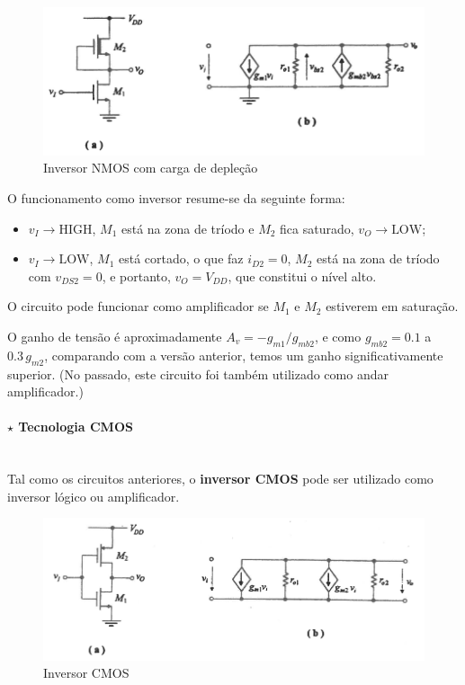 \begin{figure}[H]
    \centering
    \includegraphics[width=0.6\linewidth]{img/5/inv-NMOS-carga-dep.png}
    \caption{Inversor NMOS com carga de depleção \cite{medeiros:CTBM}}
    \label{fig:inv-NMOS-carga-dep}
\end{figure}

\vspace{-0.75em}
\noindent O funcionamento como inversor resume-se da seguinte forma:
\begin{itemize}[leftmargin=*, nolistsep, label=]
    \item $v_I \to \text{HIGH}$, $M_1$ está na zona de tríodo e $M_2$ fica saturado, $v_O \to \text{LOW}$;
    \item $v_I \to \text{LOW}$, $M_1$ está cortado, o que faz $i_{D2} = 0$, $M_2$ está na zona de tríodo com $v_{DS2} = 0$, e portanto, $v_O = V_{DD}$, que constitui o nível alto.
\end{itemize}

\begin{mdframed}
    \noindent O circuito pode funcionar como amplificador se $M_1$ e $M_2$ estiverem em saturação.

    O ganho de tensão é aproximadamente $A_v = -g_{m1}/g_{mb2}$, e como $g_{mb2} = 0.1$ a $0.3\, g_{m2}$, comparando com a versão anterior, temos um ganho significativamente superior. (No passado, este circuito foi também utilizado como andar amplificador.)
\end{mdframed}

\paragraph[5.1.1.3 Tecnologia CMOS]{$\pmb{\star}$ Tecnologia CMOS}\mbox{}\\[4pt]
Tal como os circuitos anteriores, o \textbf{inversor CMOS} pode ser utilizado como inversor lógico ou amplificador.

\begin{figure}[H]
    \centering
    \includegraphics[width=0.6\linewidth]{img/5/inv-CMOS.png}
    \caption{Inversor CMOS \cite{medeiros:CTBM}}
    \label{fig:inv-CMOS}
\end{figure}

